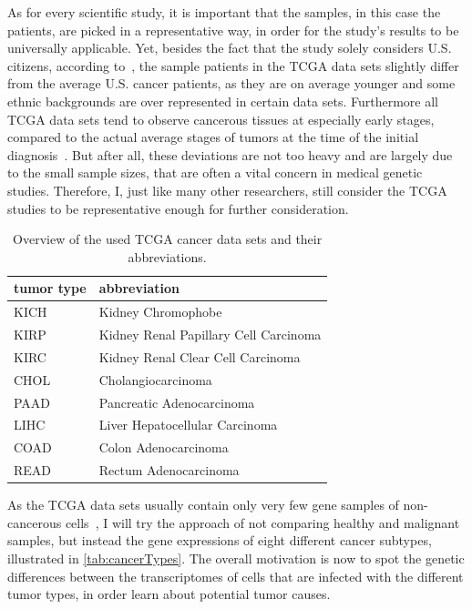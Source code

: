As for every scientific study, it is important that the samples, in this case the patients, are picked in a representative way,
in order for the study's results to be universally applicable.
Yet, besides the fact that the study solely considers U.S. citizens, according to~\cite{wang18}, the sample patients in the
TCGA data sets slightly differ from the average U.S. cancer patients, as they are on average younger and some ethnic backgrounds are over represented in certain data sets.
Furthermore all TCGA data sets tend to observe cancerous tissues at especially early stages, compared to the actual average stages
of tumors at the time of the initial diagnosis~\citep{wang18}.
But after all, these deviations are not too heavy and are largely due to the small sample sizes,
that are often a vital concern in medical genetic studies.
Therefore, I, just like many other researchers, still consider the TCGA studies to be representative enough for further consideration.

\begin{table}[ht]
        \centering
        \caption{Overview of the used TCGA cancer data sets and their abbreviations.}\label{tab:cancerTypes}
        \begin{tabular}{ll}
            \toprule
            tumor type & abbreviation \\
            \midrule
            KICH & Kidney Chromophobe \\
            KIRP & Kidney Renal Papillary Cell Carcinoma \\
            KIRC & Kidney Renal Clear Cell Carcinoma \\
            CHOL & Cholangiocarcinoma \\
            PAAD & Pancreatic Adenocarcinoma \\
            LIHC & Liver Hepatocellular Carcinoma \\
            COAD & Colon Adenocarcinoma \\ 
            READ & Rectum Adenocarcinoma \\ 
            \bottomrule
        \end{tabular}
\end{table}

As the TCGA data sets usually contain only very few gene samples of non-cancerous cells~\citep{guo13},
I will try the approach of not comparing healthy and malignant samples, but instead the gene expressions of eight
different cancer subtypes, illustrated in \autoref{tab:cancerTypes}.
The overall motivation is now to spot the genetic differences between the transcriptomes
of cells that are infected with the different tumor types,
in order learn about potential tumor causes.

